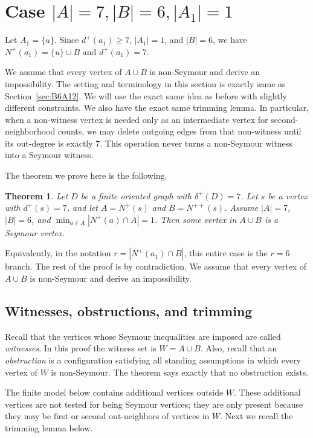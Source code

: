 \documentclass[a4paper,fleqn]{cas-sc}
\newtheorem{theorem}{Theorem}[section]
\theoremstyle{definition}
\begin{document}
\section{Case  $|A|=7, |B|=6, |A_1|=1$}\label{sec:B6A11}

Let $A_1=\{u\}.$ Since $d^+(a_1)\ge 7$, $|A_1|=1$, and $|B|=6$, we have $N^+(a_1)=\{u\}\cup B$ and $d^+(a_1)=7$.

We assume that every vertex of $A\cup B$ is non-Seymour and derive an impossibility. The setting and terminology in this section is exactly same as Section~\ref{sec:B6A12}. We will use the exact same idea as before with slightly different constraints. We also have the exact same trimming lemma. In particular, when a non-witness vertex is needed only as an intermediate vertex for second-neighborhood counts, we may delete outgoing edges from that non-witness until its out-degree is exactly $7$. This operation never turns a non-Seymour witness into a Seymour witness.


The theorem we prove here is the following.

\begin{theorem}\label{thm:B6A11}
Let $D$ be a finite oriented graph with $\delta^+(D)=7$. Let $s$ be a vertex with $d^+(s)=7$, and let $A=N^+(s)$ and $B=N^{++}(s)$.
Assume $|A|=7$, $|B|=6$, and $\min_{a\in A}|N^+(a)\cap A|=1$.
Then some vertex in $A\cup B$ is a Seymour vertex.
\end{theorem}

Equivalently, in the notation $r=|N^+(a_1)\cap B|$, this entire case is the $r=6$ branch. The rest of the proof is by contradiction. We assume that every vertex of $A\cup B$ is non-Seymour and derive an impossibility.

\subsection*{Witnesses, obstructions, and trimming}

Recall that the vertices whose Seymour inequalities are imposed are called \emph{witnesses}. In this proof the witness set is $W=A\cup B$.
Also, recall that an \emph{obstruction} is a configuration satisfying all standing assumptions in which every vertex of $W$ is non-Seymour. The theorem says exactly that no obstruction exists.

The finite model below contains additional vertices outside $W$. These additional vertices are not tested for being Seymour vertices; they are only present because they may be first or second out-neighbors of vertices in $W$. Next we recall the trimming lemma below.
\end{document}
